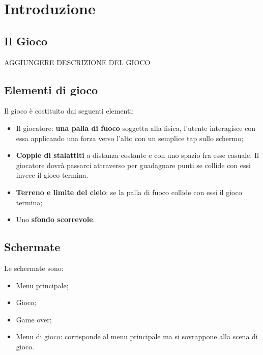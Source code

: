 \section{Introduzione}

	\subsection{Il Gioco}
	
		AGGIUNGERE DESCRIZIONE DEL GIOCO
			
			
		\subsection{Elementi di gioco}
			Il gioco è costituito dai seguenti elementi:
			\begin{itemize}
				\item Il giocatore: \textbf{una palla di fuoco} soggetta alla fisica, l'utente interagisce con essa applicando una forza verso l'alto con un semplice tap sullo schermo;
				\item \textbf{Coppie di stalattiti} a distanza costante e con uno spazio fra esse casuale. Il giocatore dovrà passarci attraverso per guadagnare punti se collide con essi invece il gioco termina.
				\item \textbf{Terreno e limite del cielo}: se la palla di fuoco collide con essi il gioco termina;
				\item Uno \textbf{sfondo scorrevole}.
			\end{itemize}
		
		\subsection{Schermate}
			Le schermate sono:
			\begin{itemize}
				\item Menu principale;
				\item Gioco;
				\item Game over;
				\item Menu di gioco: corrisponde al menu principale ma si sovrappone alla scena di gioco.
			\end{itemize}
		
